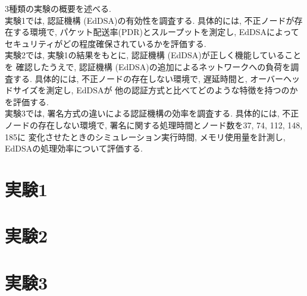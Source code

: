 \indent 3種類の実験の概要を述べる.\\
\indent 実験1では, 認証機構 (EdDSA)の有効性を調査する. 具体的には, 不正ノードが存在する環境で, 
パケット配送率(PDR)とスループットを測定し, EdDSAによってセキュリティがどの程度確保されているかを評価する. \\
\indent 実験2では, 実験1の結果をもとに, 認証機構 (EdDSA)が正しく機能していることを
確認したうえで, 認証機構 (EdDSA)の追加によるネットワークへの負荷を調査する. 
具体的には, 不正ノードの存在しない環境で, 遅延時間と, オーバーヘッドサイズを測定し, EdDSAが
他の認証方式と比べてどのような特徴を持つのかを評価する. \\
\indent 実験3では, 署名方式の違いによる認証機構の効率を調査する. 
具体的には, 不正ノードの存在しない環境で, 署名に関する処理時間とノード数を37, 74, 112, 148, 185に
変化させたときのシミュレーション実行時間, メモリ使用量を計測し, EdDSAの処理効率について評価する. \\

\section{実験1}

\section{実験2}

\section{実験3}
